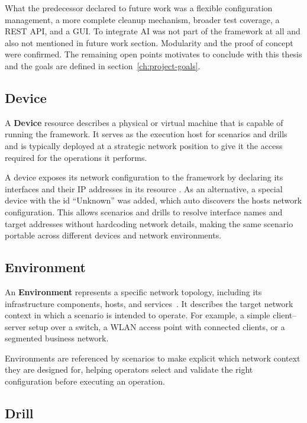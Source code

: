 What the predecessor declared to future work was a flexible configuration management, a more complete cleanup mechanism, broader test coverage, a \gls{REST API}, and a \gls{GUI}.
To integrate \gls{AI} was not part of the framework at all and also not mentioned in future work section.
Modularity and the proof of concept were confirmed.
The remaining open points motivates to conclude with this thesis and the goals are defined in section~\ref{ch:project-goals}.

\subsection{Device}\label{subsec:device-concept}

A \textbf{Device} resource describes a physical or virtual machine that is capable of running the  framework.
It serves as the execution host for scenarios and drills and is typically deployed at a strategic network position to give it the access required for the operations it performs.

A device exposes its network configuration to the framework by declaring its interfaces and their \gls{IP} addresses in its resource .
As an alternative, a special device with the id \enquote{Unknown} was added, which auto discovers the hosts network configuration.
This allows scenarios and drills to resolve interface names and target addresses without hardcoding network details, making the same scenario portable across different devices and network environments.

\subsection{Environment}\label{subsec:environment-concept}

An \textbf{Environment} represents a specific network topology, including its infrastructure components, hosts, and services~\cite{nsakRepository2026}.
It describes the target network context in which a scenario is intended to operate.
For example, a simple client--server setup over a switch, a \gls{WLAN} access point with connected clients, or a segmented business network.

Environments are referenced by scenarios to make explicit which network context they are designed for, helping operators select and validate the right configuration before executing an operation.

\subsection{Drill}\label{subsec:drill-concept}

